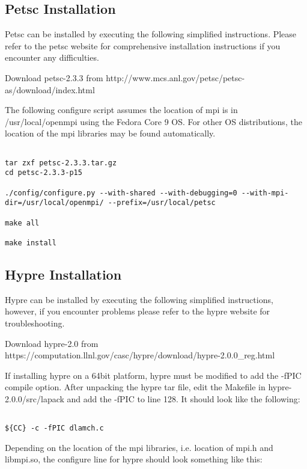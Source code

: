 \subsection{Petsc Installation}

Petsc can be installed by executing the following simplified
instructions.  Please refer to the petsc website for comprehensive
installation instructions if you encounter any difficulties.

Download petsc-2.3.3 from
http://www.mcs.anl.gov/petsc/petsc-as/download/index.html

The following configure script assumes the location of mpi is in
/usr/local/openmpi using the Fedora Core 9 OS.  For other OS
distributions, the location of the mpi libraries may be found
automatically.

\begin{Verbatim}
  
tar zxf petsc-2.3.3.tar.gz
cd petsc-2.3.3-p15

./config/configure.py --with-shared --with-debugging=0 --with-mpi-dir=/usr/local/openmpi/ --prefix=/usr/local/petsc

make all

make install

\end{Verbatim}

\subsection{Hypre Installation}

Hypre can be installed by executing the following simplified
instructions, however, if you encounter problems please refer to the
hypre website for troubleshooting.

Download hypre-2.0 from
https://computation.llnl.gov/casc/hypre/download/hypre-2.0.0\_reg.html

If installing hypre on a 64bit platform, hypre must be modified to add
the -fPIC compile option.  After unpacking the hypre tar file, edit
the Makefile in hypre-2.0.0/src/lapack and add the -fPIC to line 128.
It should look like the following:

\begin{verbatim}

${CC} -c -fPIC dlamch.c

\end{verbatim}

Depending on the location of the mpi libraries, i.e. location of mpi.h
and libmpi.so, the configure line for hypre should look something like this:

